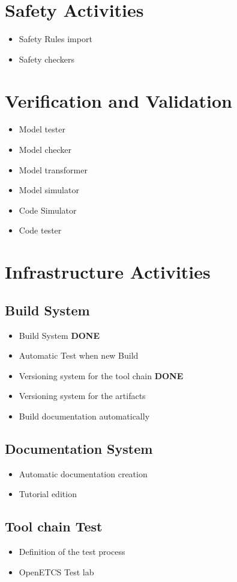 \documentclass{openetcs_report}
\begin{document}
\section{Safety Activities}
\begin{itemize}
\item Safety Rules import
\item Safety checkers
\end{itemize}

\section{Verification and Validation}
\begin{itemize}
\item Model tester
\item Model checker
\item Model transformer
\item Model simulator
\item Code Simulator
\item Code tester
\end{itemize}

\section{Infrastructure Activities}
\label{sec-2-infrastructure}

\subsection{Build System}
\begin{itemize}
\item Build System {\bf DONE}
\item Automatic Test when new Build
\item Versioning system  for the tool chain {\bf DONE}
\item Versioning system for the artifacts
\item Build documentation automatically
\end{itemize}

\subsection{Documentation System}
\begin{itemize}
\item Automatic documentation creation
\item Tutorial  edition
\end{itemize}

\subsection{Tool chain Test}
\begin{itemize}
\item Definition of the test process
\item OpenETCS Test lab
\end{itemize}
\end{document}
